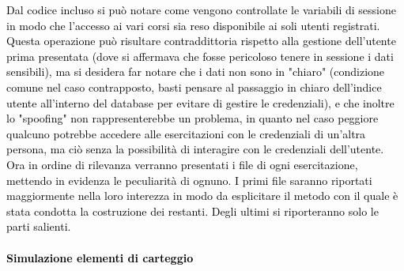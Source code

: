 \textcolor{black}{Dal codice incluso si può notare come vengono controllate le variabili di sessione in modo che l'accesso ai vari corsi sia reso disponibile ai soli utenti registrati. Questa operazione può risultare contraddittoria rispetto alla gestione dell'utente prima presentata (dove si affermava che fosse pericoloso tenere in sessione i dati sensibili), ma si desidera far notare che i dati non sono in "chiaro" (condizione comune nel caso contrapposto, basti pensare al passaggio in chiaro dell'indice utente all'interno del database per evitare di gestire le credenziali), e che inoltre lo "spoofing" non rappresenterebbe un problema, in quanto nel caso peggiore qualcuno potrebbe accedere alle esercitazioni con le  credenziali di un'altra persona, ma ciò senza la possibilità di interagire con le credenziali dell'utente.}\\
\bigskip
\textcolor{black}{Ora in ordine di rilevanza verranno presentati i file di ogni esercitazione, mettendo in evidenza le peculiarità di ognuno. I primi file saranno riportati maggiormente nella loro interezza in modo da esplicitare il metodo con il quale è stata condotta la costruzione dei restanti. Degli ultimi si riporteranno solo le parti salienti.}\\

\paragraph{\textcolor{black}{Simulazione elementi di carteggio}}\leavevmode\\

